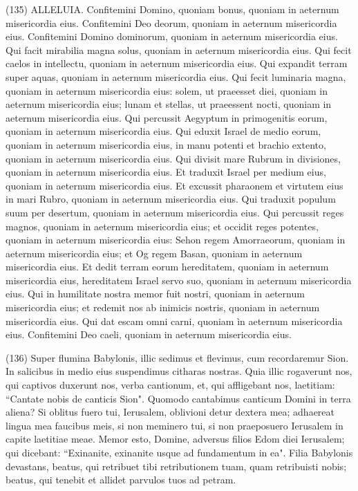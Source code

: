 \begin{biblechapter}  (135) 
\verse ALLELUIA. Confitemini Domino, quoniam bonus, quoniam in aeternum misericordia eius. 
\verse Confitemini Deo deorum, quoniam in aeternum misericordia eius. 
\verse Confitemini Domino dominorum, quoniam in aeternum misericordia eius. 
\verse Qui facit mirabilia magna solus, quoniam in aeternum misericordia eius. 
\verse Qui fecit caelos in intellectu, quoniam in aeternum misericordia eius. 
\verse Qui expandit terram super aquas, quoniam in aeternum misericordia eius. 
\verse Qui fecit luminaria magna, quoniam in aeternum misericordia eius: 
\verse solem, ut praeesset diei, quoniam in aeternum misericordia eius; 
\verse lunam et stellas, ut praeessent nocti, quoniam in aeternum misericordia eius. 
\verse Qui percussit Aegyptum in primogenitis eorum, quoniam in aeternum misericordia eius. 
\verse Qui eduxit Israel de medio eorum, quoniam in aeternum misericordia eius, 
\verse in manu potenti et brachio extento, quoniam in aeternum misericordia eius. 
\verse Qui divisit mare Rubrum in divisiones, quoniam in aeternum misericordia eius. 
\verse Et traduxit Israel per medium eius, quoniam in aeternum misericordia eius. 
\verse Et excussit pharaonem et virtutem eius in mari Rubro, quoniam in aeternum misericordia eius. 
\verse Qui traduxit populum suum per desertum, quoniam in aeternum misericordia eius. 
\verse Qui percussit reges magnos, quoniam in aeternum misericordia eius; 
\verse et occidit reges potentes, quoniam in aeternum misericordia eius: 
\verse Sehon regem Amorraeorum, quoniam in aeternum misericordia eius; 
\verse et Og regem Basan, quoniam in aeternum misericordia eius. 
\verse Et dedit terram eorum hereditatem, quoniam in aeternum misericordia eius, 
\verse hereditatem Israel servo suo, quoniam in aeternum misericordia eius. 
\verse Qui in humilitate nostra memor fuit nostri, quoniam in aeternum misericordia eius; 
\verse et redemit nos ab inimicis nostris, quoniam in aeternum misericordia eius. 
\verse Qui dat escam omni carni, quoniam ìn aeternum misericordia eius. 
\verse Confitemini Deo caeli, quoniam in aeternum misericordia eius. 
\end{biblechapter}

\begin{biblechapter}  (136) 
\verse Super flumina Babylonis, illic sedimus et flevimus, cum recordaremur Sion. 
\verse In salicibus in medio eius suspendimus citharas nostras. 
\verse Quia illic rogaverunt nos, qui captivos duxerunt nos, verba cantionum, et, qui affligebant nos, laetitiam: “Cantate nobis de canticis Sion". 
\verse Quomodo cantabimus canticum Domini in terra aliena? 
\verse Si oblitus fuero tui, Ierusalem, oblivioni detur dextera mea; 
\verse adhaereat lingua mea faucibus meis, si non meminero tui, si non praeposuero Ierusalem in capite laetitiae meae. 
\verse Memor esto, Domine, adversus filios Edom diei Ierusalem; qui dicebant: “Exinanite, exinanite usque ad fundamentum in ea". 
\verse Filia Babylonis devastans, beatus, qui retribuet tibi retributionem tuam, quam retribuisti nobis; 
\verse beatus, qui tenebit et allidet parvulos tuos ad petram. 
\end{biblechapter}

